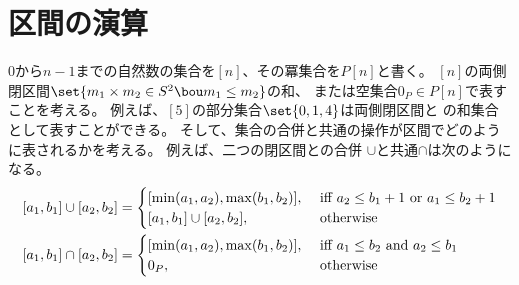 \section{区間の演算}\label{s1:区間の演算} %
	$0$から$n-1$までの自然数の集合を$[n]$、その冪集合を$P[n]$と書く。
	$[n]$の両側閉区間$\set{m_1\times m_2\in S^2\bou m_1\le m_2}$の和、
	または空集合$0_P\in P[n]$で表すことを考える。
	例えば、$[5]$の部分集合$\set{0,1,4}$は両側閉区間と
	の和集合として表すことができる。
	そして、集合の合併と共通の操作が区間でどのように表されるかを考える。
	例えば、二つの閉区間との合併
	$\cup$と共通$\cap$は次のようになる。
	\begin{equation*}\begin{split} %
		\closeclose{a_1}{b_1} \cup \closeclose{a_2}{b_2} &= \begin{cases}
			\closeclose{\min(a_1,a_2)}{\max(b_1,b_2)}
				, &\text{ iff } a_2 \le b_1 + 1 \text{ or } a_1 \le b_2 + 1 \\
			\closeclose{a_1}{b_1} \cup \closeclose{a_2}{b_2}
				, &\text{ otherwise } \\
		\end{cases} \\
		\closeclose{a_1}{b_1} \cap \closeclose{a_2}{b_2} &= \begin{cases}
			\closeclose{\min(a_1,a_2)}{\max(b_1,b_2)}
				, &\text{ iff } a_1 \le b_2 \text{ and } a_2 \le b_1 \\
			0_P, &\text{ otherwise } \\
		\end{cases} \\
	\end{split}\end{equation*} %

